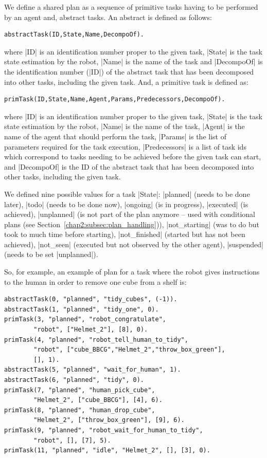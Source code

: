 \documentclass[a4paper,11pt,twoside]{StyleThese}
\begin{document}
We define a shared plan as a sequence of primitive tasks having to be performed by an agent and, abstract tasks. An abstract is defined as follows: 
\begin{lstlisting}[style=aslDef]
	abstractTask(ID,State,Name,DecompoOf).
\end{lstlisting}
\noindent
where |ID| is an identification number proper to the given task, |State| is the task state estimation by the robot, |Name| is the name of the task and |DecompoOf| is the identification number (|ID|) of the abstract task that has been decomposed into other tasks, including the given task.
\noindent
And, a primitive task is defined as:
\begin{lstlisting}[style=aslDef]
	primTask(ID,State,Name,Agent,Params,Predecessors,DecompoOf).
\end{lstlisting}
\noindent
where |ID| is an identification number proper to the given task, |State| is the task state estimation by the robot, |Name| is the name of the task, |Agent| is the name of the agent that should perform the task, |Params| is the list of parameters required for the task execution, |Predecessors| is a list of task ids which correspond to tasks needing to be achieved before the given task can start, and |DecompoOf| is the ID of the abstract task that has been decomposed into other tasks, including the given task.

We defined nine possible values for a task |State|: |planned| (needs to be done later), |todo| (needs to be done now), |ongoing| (is in progress), |executed| (is achieved), |unplanned| (is not part of the plan anymore -- used with conditional plans (see Section~\ref{chap2:subsec:plan_handling})), |not_starting| (was to do but took to much time before starting), |not_finished| (started but has not been achieved), |not_seen| (executed but not observed by the other agent), |suspended| (needs to be set |unplanned|).

So, for example, an example of plan for a task where the robot gives instructions to the human in order to remove one cube from a shelf is:
\begin{lstlisting}[style=aslDef]
abstractTask(0, "planned", "tidy_cubes", (-1)). 
abstractTask(1, "planned", "tidy_one", 0). 
primTask(3, "planned", "robot_congratulate", 
		"robot", ["Helmet_2"], [8], 0).
primTask(4, "planned", "robot_tell_human_to_tidy", 
		"robot", ["cube_BBCG","Helmet_2","throw_box_green"], 
		[], 1).
abstractTask(5, "planned", "wait_for_human", 1).
abstractTask(6, "planned", "tidy", 0).
primTask(7, "planned", "human_pick_cube",
		"Helmet_2", ["cube_BBCG"], [4], 6).
primTask(8, "planned", "human_drop_cube", 
		"Helmet_2", ["throw_box_green"], [9], 6).
primTask(9, "planned", "robot_wait_for_human_to_tidy", 
		"robot", [], [7], 5).
primTask(11, "planned", "idle", "Helmet_2", [], [3], 0).
\end{lstlisting}
\end{document}

